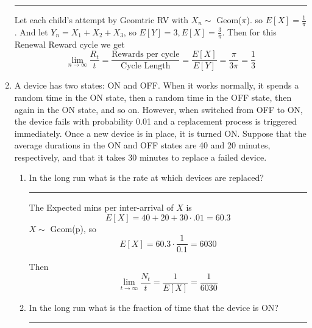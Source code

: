 \documentclass{article} %
\theoremstyle{plain}
\theoremstyle{case}
\begin{document}
\begin{enumerate}[label={\fbox{\textbf{Exercise \#\arabic* :}}}]
\par\noindent\rule{\textwidth}{0.1pt}
      Let each child's attempt by Geomtric RV with $X_n \sim $ Geom($\pi$).
    so $E[X] = \frac{1}{\pi}$.
    And let $Y_n = X_1 + X_2 + X_3$, so $E[Y] = 3, E[X] = \frac{3}{\pi}$. 
    Then for this Renewal Reward cycle we get
    \[ \lim_{n \to \infty} \frac{R_t}{t} =
        \frac{\text{Rewards per cycle}}{\text{Cycle Length}}
        = \frac{E[X]}{E[Y]}
        = \frac{\pi}{3 \pi} = \frac{1}{3}   \]
  \newpage
  \item A device has two states: ON and OFF. When it works normally, it
    spends a random time in the ON state, then a random time in the OFF
    state, then again in the ON state, and so on. However, when switched
    from OFF to ON, the device fails with probability 0.01 and a
    replacement process is triggered immediately. Once a new device is in
    place, it is turned ON. Suppose that the average durations in the ON
    and OFF states are 40 and 20 minutes, respectively, and that it takes
    30 minutes to replace a failed device.
    \begin{enumerate}
      \item In the long run what is the rate at which devices are replaced?
\par\noindent\rule{\textwidth}{0.1pt}
        The Expected mins per inter-arrival of $X$ is
        \[ E[X] = 40 + 20 + 30 \cdot .01 = 60.3 \]
        $X \sim$ Geom(p), so 
        \[ E[X] = 60.3 \cdot \frac{1}{0.1} = 6030 \]

        Then
        \[ \lim_{t \to \infty} \frac{N_t}{t} = \frac{1}{E[X]} =  \frac{1}{6030} \]
      \item In the long run what is the fraction of time that the device is ON?
\par\noindent\rule{\textwidth}{0.1pt}


\end{enumerate}
\end{enumerate}
\end{document}
